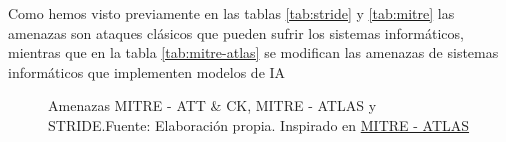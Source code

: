 Como hemos visto previamente en las tablas \ref{tab:stride} y \ref{tab:mitre} las amenazas son ataques clásicos que pueden sufrir los sistemas informáticos, mientras que en la tabla \ref{tab:mitre-atlas} se modifican las amenazas de sistemas informáticos que implementen modelos de \acrshort{IA}


               

\begin{figure}[H]
    \centering
    \centerline{}
    \caption{Amenazas MITRE - ATT \& CK, MITRE - ATLAS y STRIDE.\newline{}Fuente: Elaboración propia. Inspirado en \href{https://atlas.mitre.org/matrices/ATLAS}{MITRE - ATLAS}}
    \label{fig:amenazas-MITRE-ATLAS-STRIDE}
\end{figure}

